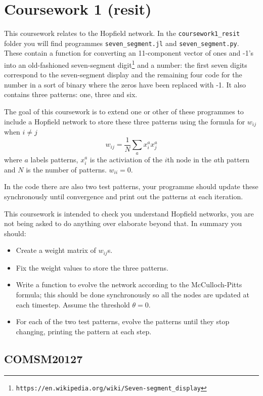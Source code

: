 \documentclass[12pt]{article}
\begin{document}
\section*{Coursework 1 (resit)}

This coursework relates to the Hopfield network. In the \texttt{coursework1\_resit}
folder you will find programmes \texttt{seven\_segment.jl} and
\texttt{seven\_segment.py}. These contain a function for converting an
11-component vector of ones and -1's into an old-fashioned
seven-segment digit\footnote{\texttt{https://en.wikipedia.org/wiki/Seven-segment\_display}} and a number: the first seven digits correspond to
the seven-segment display and the remaining four code for the number
in a sort of binary where the zeros have been replaced with -1. It
also contains three patterns: one, three and six.

The goal of this coursework is to extend one or other of these
programmes to include a Hopfield network to store these three
patterns using the formula for $w_{ij}$ when $i\not=j$
\begin{equation}
w_{ij}=\frac{1}{N}\sum_a x_i^a x_j^a
\end{equation}
where $a$ labels patterns, $x_i^a$ is the activiation of the $i$th
node in the $a$th pattern and $N$ is the number of
patterns. $w_{ii}=0$.

In the code there are also two test patterns, your programme should
update these synchronously until convergence and print out the
patterns at each iteration. 


This coursework is intended to check you understand Hopfield networks,
you are not being asked to do anything over elaborate beyond that. In
summary you should:
\begin{itemize}
\item Create a weight matrix of $w_{ij}$s.
\item Fix the weight values to store the three patterns.
\item Write a function to evolve the network according to the
  McCulloch-Pitts formula; this should be done synchronously so all the nodes are updated at each timestep. Assume the threshold $\theta=0$.
\item For each of the two test patterns, evolve the patterns until they stop changing, printing the pattern at each step.
\end{itemize}

\subsection*{COMSM20127}
\end{document}
